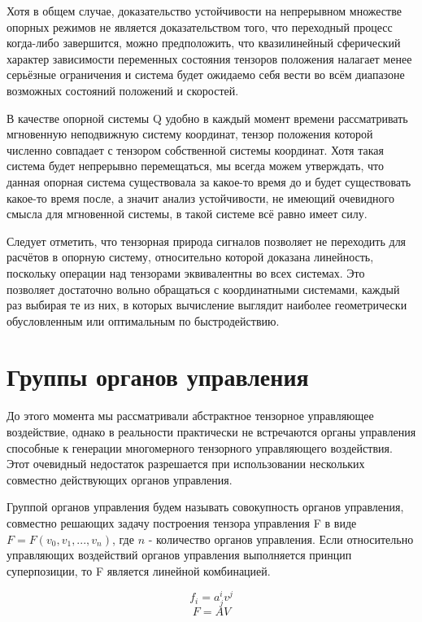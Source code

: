 \documentclass[a4paper]{article}
\begin{document}
Хотя в общем случае, доказательство устойчивости на непрерывном множестве опорных режимов не является доказательством того, что переходный процесс когда-либо завершится, можно предположить, что квазилинейный сферический характер зависимости переменных состояния тензоров положения налагает менее серьёзные ограничения и система будет ожидаемо себя вести во всём диапазоне возможных состояний положений и скоростей.

В качестве опорной системы Q удобно в каждый момент времени рассматривать мгновенную неподвижную систему координат, тензор положения которой численно совпадает с тензором собственной системы координат. Хотя такая система будет непрерывно перемещаться, мы всегда можем утверждать, что данная опорная система существовала за какое-то время до и будет существовать какое-то время после, а значит анализ устойчивости, не имеющий очевидного смысла для мгновенной системы, в такой системе всё равно имеет силу. 

Следует отметить, что тензорная природа сигналов позволяет не переходить для расчётов в опорную систему, относительно которой доказана линейность, поскольку операции над тензорами эквивалентны во всех системах. Это позволяет достаточно вольно обращаться с координатными системами, каждый раз выбирая те из них, в которых вычисление выглядит наиболее геометрически обусловленным или оптимальным по быстродействию.

\section{Группы органов управления}
До этого момента мы рассматривали абстрактное тензорное управляющее воздействие, однако в реальности практически не встречаются органы управления способные к генерации многомерного тензорного управляющего воздействия. Этот очевидный недостаток разрешается при использовании нескольких совместно действующих органов управления.

Группой органов управления будем называть совокупность органов управления, совместно решающих задачу построения тензора управления F в виде $F = F(v_0, v_1, ..., v_n)$, где $n$ - количество органов управления. Если относительно управляющих воздействий органов управления выполняется принцип суперпозиции, то F является линейной комбинацией. 

\begin{equation}f_i=a^i_jv^j\end{equation}
\begin{equation} \label{lincomb}  F=AV\end{equation}
\end{document}
